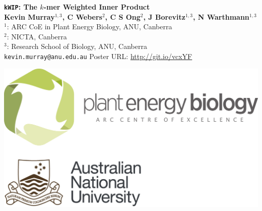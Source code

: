 \documentclass[a0,portrait]{a0poster}
\begin{document}
\begin{minipage}[b]{0.6\linewidth}
\Huge \textbf{\texttt{kWIP}: The $k$-mer Weighted Inner Product}\\[0.9cm]
\Large \textbf{Kevin Murray$^{1,3}$, C Webers$^2$, C S Ong$^2$, J Borevitz$^{1,3}$, N Warthmann$^{1,3}$}\\[0.5cm]
\large $^1$: ARC CoE in Plant Energy Biology, ANU, Canberra\\[0.2cm]
\large $^2$: NICTA, Canberra\\[0.4cm]
\large $^3$: Research School of Biology, ANU, Canberra\\[0.4cm]
\large \texttt{kevin.murray@anu.edu.au} \hspace{1cm} Poster URL: \large
  \url{http://git.io/vcxYF}\\
\end{minipage}
\begin{minipage}[b]{0.4\linewidth}
  \hspace{5cm}
\includegraphics[width=20cm]{logo.png}\\
\end{minipage}

\vspace{1cm} %
\end{document}
